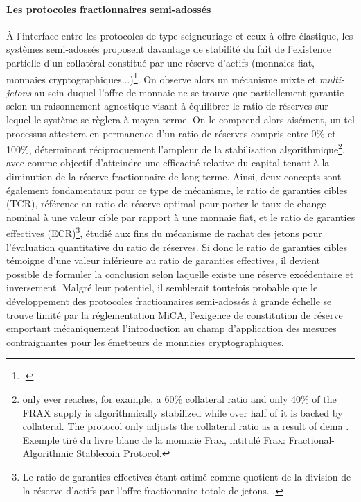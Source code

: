 {\paragraph{Les protocoles fractionnaires semi-adossés}

À l'interface entre les protocoles de type seigneuriage et ceux à offre élastique, les systèmes semi-adossés proposent davantage de stabilité du fait de l'existence partielle d'un collatéral constitué par une réserve d'actifs (monnaies fiat, monnaies cryptographiques...)\footnote{.}. On observe alors un mécanisme mixte et \emph{multi-jetons} au sein duquel l'offre de monnaie ne se trouve que partiellement garantie selon un raisonnement agnostique visant à équilibrer le ratio de réserves sur lequel le système se règlera à moyen terme. On le comprend alors aisément, un tel processus attestera en permanence d'un ratio de réserves compris entre 0\% et 100\%, déterminant réciproquement l'ampleur de la stabilisation algorithmique\footnote{\og  only ever reaches, for example, a 60\% collateral ratio and only 40\% of the FRAX supply is algorithmically stabilized while over half of it is backed by collateral. The protocol only adjusts the collateral ratio as a result of dema \fg{}. Exemple tiré du livre blanc de la monnaie Frax, intitulé \og Frax: Fractional-Algorithmic Stablecoin Protocol\fg{}.}, avec comme objectif d'atteindre une efficacité relative du capital tenant à la diminution de la réserve fractionnaire de long terme. Ainsi, deux concepts sont également fondamentaux pour ce type de mécanisme, le ratio de garanties cibles (\acrshort{TCR}), référence au ratio de réserve optimal pour porter le taux de change nominal à une valeur cible par rapport à une monnaie fiat, et le ratio de garanties effectives (\acrshort{ECR})\footnote{Le ratio de garanties effectives  étant estimé comme quotient de la division de la réserve d'actifs par l'offre fractionnaire totale de jetons. .}, étudié aux fins du mécanisme de rachat des jetons pour l'évaluation quantitative du ratio de réserves. Si donc le ratio de garanties cibles témoigne d'une valeur inférieure au ratio de garanties effectives, il devient possible de formuler la conclusion selon laquelle existe une réserve excédentaire et inversement. Malgré leur potentiel, il semblerait toutefois probable que le développement des protocoles fractionnaires semi-adossés à grande échelle se trouve limité par la réglementation MiCA, l'exigence de constitution de réserve emportant mécaniquement l'introduction au champ d'application des mesures contraignantes pour les émetteurs de monnaies cryptographiques.\par

}
